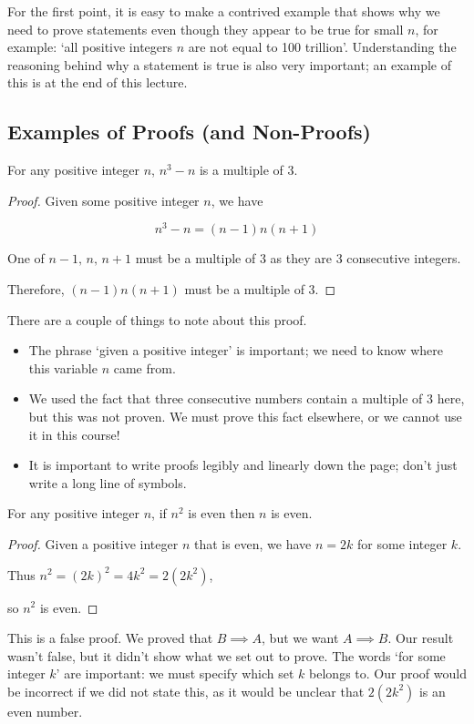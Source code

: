 \documentclass{article}
\begin{document}
	For the first point, it is easy to make a contrived example that shows why we need to prove statements even though they appear to be true for small $n$, for example: `all positive integers $n$ are not equal to 100 trillion'. Understanding the reasoning behind why a statement is true is also very important; an example of this is at the end of this lecture.
	
	\subsection{Examples of Proofs (and Non-Proofs)}
	\begin{claim}
		For any positive integer $n$, $n^3-n$ is a multiple of 3.
	\end{claim}
	\begin{proof}
		Given some positive integer $n$, we have

		\[ n^3 - n = (n-1)n(n+1) \]
		
		One of $n-1,\,n,\,n+1$ must be a multiple of 3 as they are 3 consecutive integers.
		
		Therefore, $(n-1)n(n+1)$ must be a multiple of 3.
	\end{proof}

	There are a couple of things to note about this proof.
	\begin{itemize}
		\item The phrase `given a positive integer' is important; we need to know where this variable $n$ came from.
		\item We used the fact that three consecutive numbers contain a multiple of 3 here, but this was not proven. We must prove this fact elsewhere, or we cannot use it in this course!
		\item It is important to write proofs legibly and linearly down the page; don't just write a long line of symbols.
	\end{itemize}

	\begin{claim}
		For any positive integer $n$, if $n^2$ is even then $n$ is even.
	\end{claim}
	\begin{proof}
		Given a positive integer $n$ that is even, we have $n=2k$ for some integer $k$.
		
		Thus $n^2 = (2k)^2 = 4k^2 = 2(2k^2)$,
		
		so $n^2$ is even.
	\end{proof}
	\begin{note}
		This is a false proof. We proved that $B \implies A$, but we want $A \implies B$. Our result wasn't false, but it didn't show what we set out to prove. The words `for some integer $k$' are important: we must specify which set $k$ belongs to. Our proof would be incorrect if we did not state this, as it would be unclear that $2(2k^2)$ is an even number.
	\end{note}
\end{document}
